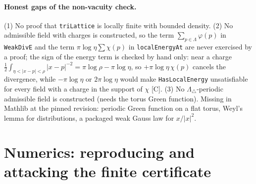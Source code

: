 \documentclass[10pt]{article}
\newcommand{\tier}[1]{\textsf{[#1]}}
\newcommand{\lean}[1]{\texttt{#1}}
\begin{document}
\paragraph{Honest gaps of the non-vacuity check.} (1) No proof that \lean{triLattice} is locally finite with bounded density. (2) No admissible field with charges is constructed, so the term $\sum_{p\in\Lambda}\varphi(p)$ in \lean{WeakDivE} and the term $\pi\log\eta\sum\chi(p)$ in \lean{localEnergyAt} are never exercised by a proof; the sign of the energy term is checked by hand only: near a charge $\tfrac12\int_{\eta<|x-p|<\rho}|x-p|^{-2}=\pi\log\rho-\pi\log\eta$, so $+\pi\log\eta\,\chi(p)$ cancels the divergence, while $-\pi\log\eta$ or $2\pi\log\eta$ would make \lean{HasLocalEnergy} unsatisfiable for every field with a charge in the support of $\chi$ \tier{C}. (3) No $\Lambda_\triangle$-periodic admissible field is constructed (needs the torus Green function). Missing in Mathlib at the pinned revision: periodic Green function on a flat torus, Weyl's lemma for distributions, a packaged weak Gauss law for $x/|x|^2$.

\section{Numerics: reproducing and attacking the finite certificate}\label{sec:num}
\end{document}
